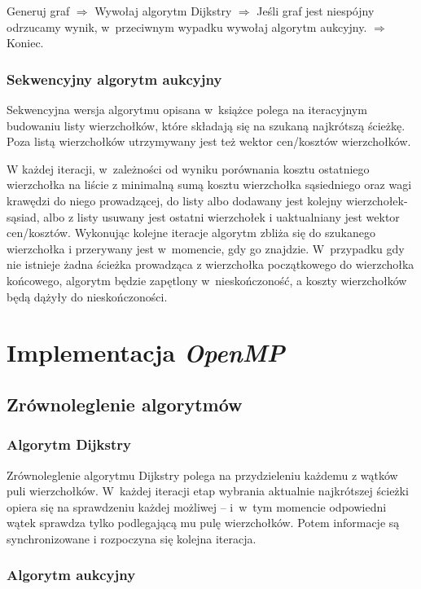 \documentclass {report}
\begin{document}
Generuj graf $\Rightarrow$ Wywołaj algorytm Dijkstry $\Rightarrow$ Jeśli graf jest niespójny odrzucamy wynik, w~przeciwnym wypadku wywołaj algorytm aukcyjny. $\Rightarrow$ Koniec.

\subsection{Sekwencyjny algorytm aukcyjny}

Sekwencyjna wersja algorytmu opisana w~książce \cite{Bertsekas1998} polega na iteracyjnym budowaniu listy wierzchołków, które składają się na szukaną najkrótszą ścieżkę. Poza listą wierzchołków utrzymywany jest też wektor cen/kosztów wierzchołków.

W każdej iteracji, w~zależności od wyniku porównania kosztu ostatniego wierzchołka na liście z minimalną sumą kosztu wierzchołka sąsiedniego oraz wagi krawędzi do niego prowadzącej, do listy albo dodawany jest kolejny wierzchołek-sąsiad, albo z listy usuwany jest ostatni wierzchołek i uaktualniany jest wektor cen/kosztów. Wykonując kolejne iteracje algorytm zbliża się do szukanego wierzchołka i przerywany jest w~momencie, gdy go znajdzie. W~przypadku gdy nie istnieje żadna ścieżka prowadząca z wierzchołka początkowego do wierzchołka końcowego, algorytm będzie zapętlony w~nieskończoność, a koszty wierzchołków będą dążyły do nieskończoności.

\chapter{Implementacja \emph{OpenMP}}

\section{Zrównoleglenie algorytmów}

\subsection{Algorytm Dijkstry}

Zrównoleglenie algorytmu Dijkstry polega na przydzieleniu każdemu z wątków puli wierzchołków. W~każdej iteracji etap wybrania aktualnie najkrótszej ścieżki opiera się na sprawdzeniu każdej możliwej -- i~w~tym momencie odpowiedni wątek sprawdza tylko podlegającą mu pulę wierzchołków. Potem informacje są synchronizowane i rozpoczyna się kolejna iteracja.

\subsection{Algorytm aukcyjny}
\end{document}
